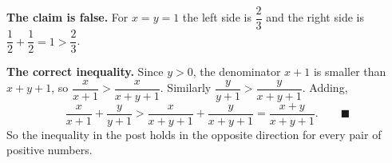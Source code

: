 \textbf{The claim is false.} For $x=y=1$ the left side is $\dfrac{2}{3}$ and the right side is $\dfrac{1}{2}+\dfrac{1}{2}=1>\dfrac{2}{3}$.

\textbf{The correct inequality.} Since $y>0$, the denominator $x+1$ is smaller than $x+y+1$, so $\dfrac{x}{x+1}>\dfrac{x}{x+y+1}$. Similarly $\dfrac{y}{y+1}>\dfrac{y}{x+y+1}$. Adding,
\[
\dfrac{x}{x+1}+\dfrac{y}{y+1}>\dfrac{x}{x+y+1}+\dfrac{y}{x+y+1}=\dfrac{x+y}{x+y+1}. \qquad\blacksquare
\]
So the inequality in the post holds in the opposite direction for every pair of positive numbers.
